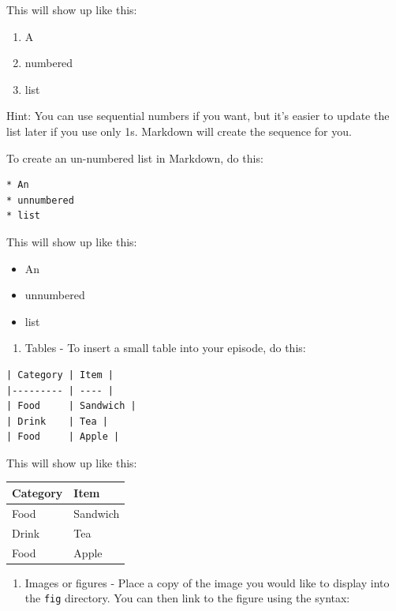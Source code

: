 \documentclass[
]{book}
\providecommand{\tightlist}{%
  \setlength{\itemsep}{0pt}\setlength{\parskip}{0pt}}
\begin{document}
This will show up like this:

\begin{enumerate}
\def\labelenumi{\arabic{enumi}.}
\tightlist
\item
  A
\item
  numbered
\item
  list
\end{enumerate}

Hint: You can use sequential numbers if you want, but it's easier to update the list later if you use only 1s.
Markdown will create the sequence for you.

To create an un-numbered list in Markdown, do this:

\begin{verbatim}
* An
* unnumbered
* list
\end{verbatim}

This will show up like this:

\begin{itemize}
\tightlist
\item
  An
\item
  unnumbered
\item
  list
\end{itemize}

\begin{enumerate}
\def\labelenumi{\arabic{enumi}.}
\tightlist
\item
  Tables - To insert a small table into your episode, do this:
\end{enumerate}

\begin{verbatim}
| Category | Item |
|--------- | ---- |
| Food     | Sandwich |
| Drink    | Tea |
| Food     | Apple |
\end{verbatim}

This will show up like this:

\begin{longtable}[]{@{}ll@{}}
\toprule
Category & Item\tabularnewline
\midrule
\endhead
Food & Sandwich\tabularnewline
Drink & Tea\tabularnewline
Food & Apple\tabularnewline
\bottomrule
\end{longtable}

\begin{enumerate}
\def\labelenumi{\arabic{enumi}.}
\tightlist
\item
  Images or figures - Place a copy of the image you would like to display into the \texttt{fig} directory. You can
  then link to the figure using the syntax:
\end{enumerate}
\end{document}
